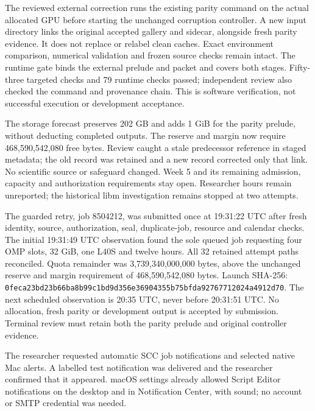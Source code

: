 The reviewed external correction runs the existing parity command on the actual
allocated GPU before starting the unchanged corruption controller. A new input
directory links the original accepted gallery and sidecar, alongside fresh
parity evidence. It does not replace or relabel clean caches. Exact environment
comparison, numerical validation and frozen source checks remain intact.
The runtime gate binds the external prelude and packet and covers both stages.
Fifty-three targeted checks and 79 runtime checks passed; independent review
also checked the command and provenance chain. This is software verification,
not successful execution or development acceptance.

The storage forecast preserves 202 GB and adds 1 GiB for the parity prelude,
without deducting completed outputs. The reserve and margin now require
468,590,542,080 free bytes. Review caught a stale predecessor reference in staged
metadata; the old record was retained and a new record corrected only that link.
No scientific source or safeguard changed. Week 5 and its remaining admission,
capacity and authorization requirements stay open. Researcher hours remain
unreported; the historical libm investigation remains stopped at two attempts.

The guarded retry, job 8504212, was submitted once at 19:31:22 UTC after fresh
identity, source, authorization, seal, duplicate-job, resource and calendar checks.
The initial 19:31:49 UTC observation found the sole queued job requesting four OMP
slots, 32 GiB, one L40S and twelve hours. All 32 retained attempt paths reconciled.
Quota remainder was 3,739,340,000,000 bytes, above the unchanged reserve and margin
requirement of 468,590,542,080 bytes. Launch SHA-256:
\texttt{0feca23bd23b66ba8b99c1bd9d356e36904355b75bfda92767712024a4912d70}.
The next scheduled observation is 20:35 UTC, never before 20:31:51 UTC.
No allocation, fresh parity or development output is accepted by submission.
Terminal review must retain both the parity prelude and original controller evidence.



The researcher requested automatic SCC job notifications and selected native Mac
alerts. A labelled test notification was delivered and the researcher confirmed
that it appeared. macOS settings already allowed Script Editor notifications on
the desktop and in Notification Center, with sound; no account or SMTP credential
was needed.

